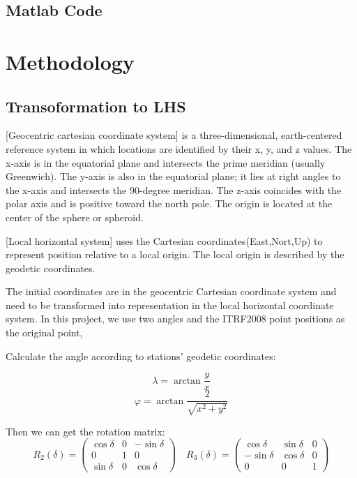 \documentclass{article}
\begin{document}
\subsection{Matlab Code}

\section{Methodology}
\subsection{Transoformation to LHS}
[Geocentric cartesian coordinate system] is a three-dimensional, earth-centered reference system in which locations are identified by their x, y, and z values. 
The x-axis is in the equatorial plane and intersects the prime meridian (usually Greenwich). 
The y-axis is also in the equatorial plane; it lies at right angles to the x-axis and intersects the 90-degree meridian. 
The z-axis coincides with the polar axis and is positive toward the north pole. The origin is located at the center of the sphere or spheroid.

[Local horizontal system] uses the Cartesian coordinates(East,Nort,Up) to represent position relative to a local origin. The local origin is described by the geodetic coordinates.

The initial coordinates are in the geocentric Cartesian coordinate system and need to be transformed into representation in the local horizontal coordinate system.
In this project, we use two angles and the ITRF2008 point positions as the original point, 

Calculate the angle according to stations' geodetic coordinates:

$$\lambda=\arctan\frac{y}{x}$$ 
$$\varphi=\arctan\frac{2}{\sqrt{x^{2}+y^{2}}}$$

Then we can get the rotation matrix:
$$R_2(\delta)=\begin{pmatrix}\cos\delta&0&-\sin\delta\\0&1&0\\\sin\delta&0&\cos\delta\end{pmatrix}\quad R_3(\delta)= \begin{pmatrix}\cos\delta&\sin\delta&0\\-\sin\delta&\cos\delta&0\\0&0&1\end{pmatrix}$$
\end{document}
